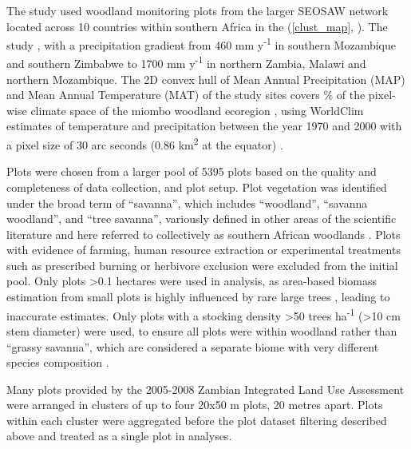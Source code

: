 \documentclass[11pt,a4paper]{article}
\newcommand{\textapprox}{\raisebox{0.5ex}{\texttildelow}}  %
\begin{document}
The study used \nplots{} woodland monitoring plots from the larger SEOSAW network \citep{seosaw_web} located across 10 countries within southern Africa in the  (\autoref{clust_map}, \citealt{White1987}). The study , with a precipitation gradient from \textapprox{}460 mm y\textsuperscript{-1} in southern Mozambique and southern Zimbabwe to \textapprox{}1700 mm y\textsuperscript{-1} in northern Zambia, Malawi and northern Mozambique. The 2D convex hull of Mean Annual Precipitation (MAP) and Mean Annual Temperature (MAT) of the study sites covers \hullcover{}\% of the pixel-wise climate space of the miombo woodland ecoregion  \citep{White1987}, using WorldClim estimates of temperature and precipitation between the year 1970 and 2000 with a pixel size of 30 arc seconds (0.86 km\textsuperscript{2} at the equator) \citep{Fick2017}. 

Plots were chosen from a larger pool of 5395 plots based on the quality and completeness of data collection, and plot setup. Plot vegetation was identified under the broad term of ``savanna'', which includes ``woodland'', ``savanna woodland'', and ``tree savanna'', variously defined in other areas of the scientific literature and here referred to collectively as southern African woodlands \citep{Ratnam2011, Hill2010}. Plots with evidence of farming, human resource extraction or experimental treatments such as prescribed burning or herbivore exclusion were excluded from the initial pool. Only plots >0.1 hectares were used in analysis, as area-based biomass estimation from small plots is highly influenced by rare large trees \citep{Stegen2011}, leading to inaccurate estimates. Only plots with a stocking density >50 trees ha\textsuperscript{-1} (>10 cm stem diameter) were used, to ensure all plots were within woodland rather than ``grassy savanna'', which are considered a separate biome with very different species composition \citep{Parr2014}. 

Many plots provided by the 2005-2008 Zambian Integrated Land Use Assessment \citep{Mukosha2009} were arranged in clusters of up to four 20x50 m plots, 20 metres apart. Plots within each cluster were aggregated before the plot dataset filtering described above and treated as a single plot in analyses.

\end{document}
